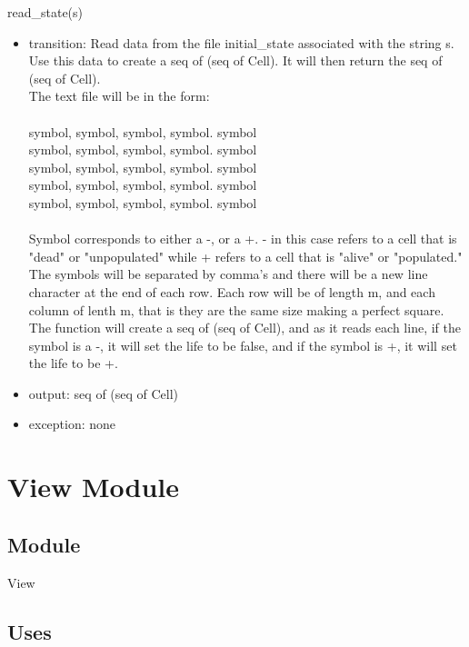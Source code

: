 \documentclass[12pt]{article}
\begin{document}
read\_state(s)
\begin{itemize}
    \item transition: Read data from the file initial\_state associated with the string s. Use this data to create a seq of (seq of Cell). It will then return the seq of (seq of Cell).\\
    The text file will be in the form:\\
    \\
    symbol, symbol, symbol, symbol. symbol\\
    symbol, symbol, symbol, symbol. symbol\\
    symbol, symbol, symbol, symbol. symbol\\
    symbol, symbol, symbol, symbol. symbol\\
    symbol, symbol, symbol, symbol. symbol\\
    \\
    Symbol corresponds to either a -, or a +. - in this case refers to a cell that is "dead" or "unpopulated" while + refers to a cell that is "alive" or "populated." The symbols will be separated by comma's and there will be a new line character at the end of each row. Each row will be of length m, and each column of lenth m, that is they are the same size making a perfect square.\\
    
    The function will create a seq of (seq of Cell), and as it reads each line, if the symbol is a -, it will set the life to be false, and if the symbol is +, it will set the life to be +.
    
    \item output: seq of (seq of Cell)
    \item exception: none
\end{itemize}

\newpage

\section* {View Module}

\subsection*{Module}

View

\subsection* {Uses}
\end{document}
